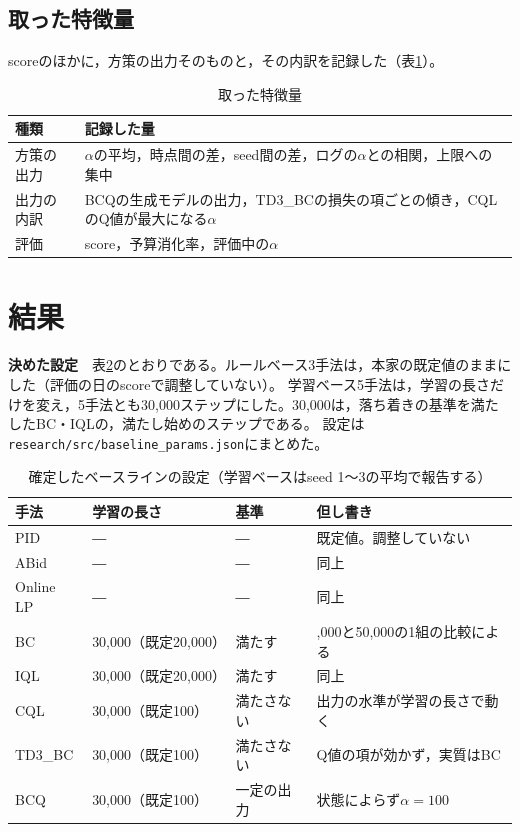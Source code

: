 \documentclass[twocolumn, 10pt]{ujarticle}
\begin{document}
\subsection{取った特徴量}\label{sec:e-feat}

scoreのほかに，方策の出力そのものと，その内訳を記録した（表\ref{tab:feat}）。

\begin{table}[H]
\centering
\caption{取った特徴量}
\label{tab:feat}
\footnotesize
\begin{tabularx}{\linewidth}{@{}l>{\raggedright\arraybackslash}X@{}}
\toprule
種類 & 記録した量 \\
\midrule
方策の出力 & $\alpha$の平均，時点間の差，seed間の差，ログの$\alpha$との相関，上限への集中 \\
出力の内訳 & BCQの生成モデルの出力，TD3\_BCの損失の項ごとの傾き，CQLのQ値が最大になる$\alpha$ \\
評価 & score，予算消化率，評価中の$\alpha$ \\
\bottomrule
\end{tabularx}
\end{table}

\section{結果}\label{sec:e-result}

\textbf{決めた設定}　表\ref{tab:set}のとおりである。ルールベース3手法は，本家の既定値のままにした（評価の日のscoreで調整していない）。
学習ベース5手法は，学習の長さだけを変え，5手法とも30,000ステップにした。30,000は，落ち着きの基準を満たしたBC・IQLの，満たし始めのステップである。
設定は\texttt{research/src/baseline\_params.json}にまとめた。

\begin{table}[H]
\centering
\caption{確定したベースラインの設定（学習ベースはseed 1〜3の平均で報告する）}
\label{tab:set}
\footnotesize\setlength{\tabcolsep}{3pt}
\begin{tabularx}{\linewidth}{@{}lll>{\raggedright\arraybackslash}X@{}}
\toprule
手法 & 学習の長さ & 基準 & 但し書き \\
\midrule
PID & ― & ― & 既定値。調整していない \\
ABid & ― & ― & 同上 \\
Online LP & ― & ― & 同上 \\
\midrule
BC & 30,000（既定20,000） & 満たす & 30,000と50,000の1組の比較による \\
IQL & 30,000（既定20,000） & 満たす & 同上 \\
CQL & 30,000（既定100） & 満たさない & 出力の水準が学習の長さで動く \\
TD3\_BC & 30,000（既定100） & 満たさない & Q値の項が効かず，実質はBC \\
BCQ & 30,000（既定100） & 一定の出力 & 状態によらず$\alpha=100$ \\
\bottomrule
\end{tabularx}
\end{table}
\end{document}
